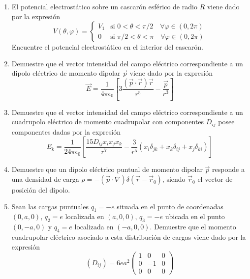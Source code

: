 \documentclass[12pt,a4paper]{book}
\begin{document}
\begin{enumerate}
\item El potencial electrostático sobre un cascarón esférico de radio $R$ viene dado por la expresión
\begin{equation*}
V(\theta, \varphi) = 
\begin{cases}
V_1 & \text{si } 0 < \theta < \pi/2 \quad \forall \varphi \in (0, 2\pi) \\
0 & \text{si } \pi/2 < \theta < \pi \quad \forall \varphi \in (0, 2\pi)
\end{cases}
\end{equation*}
Encuentre el potencial electrostático en el interior del cascarón.

\item Demuestre que el vector intensidad del campo eléctrico correspondiente a un dipolo eléctrico de momento dipolar $\vec{p}$ viene dado por la expresión
\begin{equation*}
\vec{E} = \frac{1}{4\pi\epsilon_0}\left[3\frac{(\vec{p} \cdot \vec{r})\vec{r}}{r^5} - \frac{\vec{p}}{r^3}\right]
\end{equation*}

\item Demuestre que el vector intensidad del campo eléctrico correspondiente a un cuadrupolo eléctrico de momento cuadrupolar con componentes $D_{ij}$ posee componentes dadas por la expresión
\begin{equation*}
E_k = \frac{1}{24\pi\epsilon_0}\left[\frac{15D_{ij}x_ix_jx_k}{r^7} - \frac{3}{r^5}(x_i\delta_{jk} + x_k\delta_{ij} + x_j\delta_{ki})\right]
\end{equation*}

\item Demuestre que un dipolo eléctrico puntual de momento dipolar $\vec{p}$ responde a una densidad de carga $\rho = -(\vec{p} \cdot \nabla)\delta(\vec{r} - \vec{r}_0)$, siendo $\vec{r}_0$ el vector de posición del dipolo.

\item Sean las cargas puntuales $q_1 = -e$ situada en el punto de coordenadas $(0, a, 0)$, $q_2 = e$ localizada en $(a, 0, 0)$, $q_3 = -e$ ubicada en el punto $(0, -a, 0)$ y $q_4 = e$ localizada en $(-a, 0, 0)$. Demuestre que el momento cuadrupolar eléctrico asociado a esta distribución de cargas viene dado por la expresión
\begin{equation*}
(D_{ij}) = 6ea^2 \begin{pmatrix} 
1 & 0 & 0 \\
0 & -1 & 0 \\
0 & 0 & 0
\end{pmatrix}
\end{equation*}


\end{enumerate}
\end{document}
